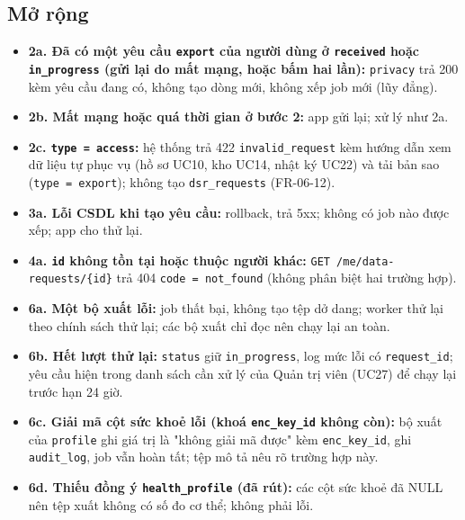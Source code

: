 \subsection{Mở rộng}
\begin{itemize}
\item \textbf{2a. Đã có một yêu cầu {\small\texttt{export}} của người dùng ở {\small\texttt{received}} hoặc {\small\texttt{in\_\allowbreak{}\allowbreak{}progress}} (gửi lại do mất mạng, hoặc bấm hai lần):} {\small\texttt{privacy}} trả 200 kèm yêu cầu đang có, không tạo dòng mới, không xếp job mới (lũy đẳng).
\item \textbf{2b. Mất mạng hoặc quá thời gian ở bước 2:} app gửi lại; xử lý như 2a.
\item \textbf{2c. {\small\texttt{type = access}}:} hệ thống trả 422 {\small\texttt{invalid\_\allowbreak{}\allowbreak{}request}} kèm hướng dẫn xem dữ liệu tự phục vụ (hồ sơ UC10, kho UC14, nhật ký UC22) và tải bản sao ({\small\texttt{type = export}}); không tạo {\small\texttt{dsr\_\allowbreak{}\allowbreak{}requests}} (FR-\allowbreak{}06-\allowbreak{}12).
\item \textbf{3a. Lỗi CSDL khi tạo yêu cầu:} rollback, trả 5xx; không có job nào được xếp; app cho thử lại.
\item \textbf{4a. {\small\texttt{id}} không tồn tại hoặc thuộc người khác:} {\small\texttt{GET /\allowbreak{}\allowbreak{}me/\allowbreak{}\allowbreak{}data-\allowbreak{}requests/\allowbreak{}\allowbreak{}\{id\}}} trả 404 {\small\texttt{code = not\_\allowbreak{}\allowbreak{}found}} (không phân biệt hai trường hợp).
\item \textbf{6a. Một bộ xuất lỗi:} job thất bại, không tạo tệp dở dang; worker thử lại theo chính sách thử lại; các bộ xuất chỉ đọc nên chạy lại an toàn.
\item \textbf{6b. Hết lượt thử lại:} {\small\texttt{status}} giữ {\small\texttt{in\_\allowbreak{}\allowbreak{}progress}}, log mức lỗi có {\small\texttt{request\_\allowbreak{}\allowbreak{}id}}; yêu cầu hiện trong danh sách cần xử lý của Quản trị viên (UC27) để chạy lại trước hạn 24 giờ.
\item \textbf{6c. Giải mã cột sức khoẻ lỗi (khoá {\small\texttt{enc\_\allowbreak{}\allowbreak{}key\_\allowbreak{}\allowbreak{}id}} không còn):} bộ xuất của {\small\texttt{profile}} ghi giá trị là "không giải mã được" kèm {\small\texttt{enc\_\allowbreak{}\allowbreak{}key\_\allowbreak{}\allowbreak{}id}}, ghi {\small\texttt{audit\_\allowbreak{}\allowbreak{}log}}, job vẫn hoàn tất; tệp mô tả nêu rõ trường hợp này.
\item \textbf{6d. Thiếu đồng ý {\small\texttt{health\_\allowbreak{}\allowbreak{}profile}} (đã rút):} các cột sức khoẻ đã NULL nên tệp xuất không có số đo cơ thể; không phải lỗi.

\end{itemize}
